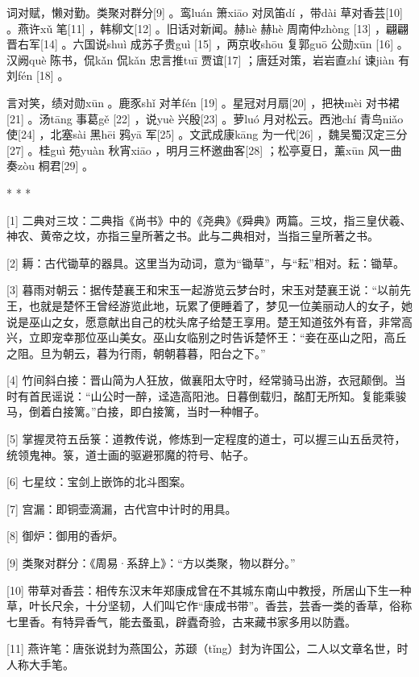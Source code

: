 \documentclass[12pt,UTF8]{ctexbook}
\begin{document}
词对赋，懒对勤。类聚对群分[9] 。鸾luán 箫xiāo 对凤笛dí ，带dài 草对香芸[10] 。燕许xǔ 笔[11] ，韩柳文[12] 。旧话对新闻。赫hè 赫hè 周南仲zhòng [13] ，翩翩晋右军[14] 。六国说shuì 成苏子贵guì [15] ，两京收shōu 复郭guō 公勋xūn [16] 。汉阙què 陈书，侃kǎn 侃kǎn 忠言推tuī 贾谊[17] ；唐廷对策，岩岩直zhí 谏jiàn 有刘fén [18] 。

言对笑，绩对勋xūn 。鹿豕shǐ 对羊fén [19] 。星冠对月扇[20] ，把袂mèi 对书裙[21] 。汤tāng 事葛gě [22] ，说yuè 兴殷[23] 。萝luó 月对松云。西池chí 青鸟niǎo 使[24] ，北塞sài 黑hēi 鸦yā 军[25] 。文武成康kāng 为一代[26] ，魏吴蜀汉定三分[27] 。桂guì 苑yuàn 秋宵xiāo ，明月三杯邀曲客[28] ；松亭夏日，薰xūn 风一曲奏zòu 桐君[29] 。



* * *



[1] 二典对三坟：二典指《尚书》中的《尧典》《舜典》两篇。三坟，指三皇伏羲、神农、黄帝之坟，亦指三皇所著之书。此与二典相对，当指三皇所著之书。

[2] 耨：古代锄草的器具。这里当为动词，意为“锄草”，与“耘”相对。耘：锄草。

[3] 暮雨对朝云：据传楚襄王和宋玉一起游览云梦台时，宋玉对楚襄王说：“以前先王，也就是楚怀王曾经游览此地，玩累了便睡着了，梦见一位美丽动人的女子，她说是巫山之女，愿意献出自己的枕头席子给楚王享用。楚王知道弦外有音，非常高兴，立即宠幸那位巫山美女。巫山女临别之时告诉楚怀王：“妾在巫山之阳，高丘之阻。旦为朝云，暮为行雨，朝朝暮暮，阳台之下。”

[4] 竹间斜白接：晋山简为人狂放，做襄阳太守时，经常骑马出游，衣冠颠倒。当时有首民谣说：“山公时一醉，迳造高阳池。日暮倒载归，酩酊无所知。复能乘骏马，倒着白接篱。”白接，即白接篱，当时一种帽子。

[5] 掌握灵符五岳箓：道教传说，修炼到一定程度的道士，可以握三山五岳灵符，统领鬼神。箓，道士画的驱避邪魔的符号、帖子。

[6] 七星纹：宝剑上嵌饰的北斗图案。

[7] 宫漏：即铜壶滴漏，古代宫中计时的用具。

[8] 御炉：御用的香炉。

[9] 类聚对群分：《周易·系辞上》：“方以类聚，物以群分。”

[10] 带草对香芸：相传东汉末年郑康成曾在不其城东南山中教授，所居山下生一种草，叶长尺余，十分坚韧，人们叫它作“康成书带”。香芸，芸香一类的香草，俗称七里香。有特异香气，能去蚤虱，辟蠹奇验，古来藏书家多用以防蠹。

[11] 燕许笔：唐张说封为燕国公，苏颋（tǐng）封为许国公，二人以文章名世，时人称大手笔。
\end{document}

